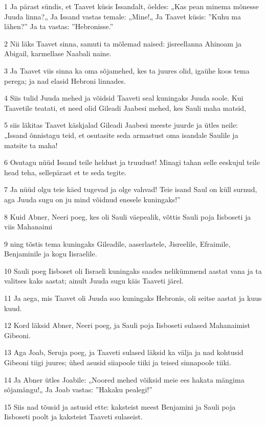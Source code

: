 \par 1 Ja pärast sündis, et Taavet küsis Issandalt, öeldes: „Kas pean minema mõnesse Juuda linna?„ Ja Issand vastas temale: „Mine!„ Ja Taavet küsis: ”Kuhu ma lähen?” Ja ta vastas: ”Hebronisse.”
\par 2 Nii läks Taavet sinna, samuti ta mõlemad naised: jisreellanna Ahinoam ja Abigail, karmellase Naabali naine.
\par 3 Ja Taavet viis sinna ka oma sõjamehed, kes ta juures olid, igaühe koos tema perega; ja nad elasid Hebroni linnades.
\par 4 Siis tulid Juuda mehed ja võidsid Taaveti seal kuningaks Juuda soole. Kui Taavetile teatati, et need olid Gileadi Jaabesi mehed, kes Sauli maha matsid,
\par 5 siis läkitas Taavet käskjalad Gileadi Jaabesi meeste juurde ja ütles neile: „Issand õnnistagu teid, et osutasite seda armastust oma isandale Saulile ja matsite ta maha!
\par 6 Osutagu nüüd Issand teile heldust ja truudust! Minagi tahan selle eeskujul teile head teha, sellepärast et te seda tegite.
\par 7 Ja nüüd olgu teie käed tugevad ja olge vahvad! Teie isand Saul on küll surnud, aga Juuda sugu on ju mind võidnud enesele kuningaks!”
\par 8 Kuid Abner, Neeri poeg, kes oli Sauli väepealik, võttis Sauli poja Iisboseti ja viis Mahanaimi
\par 9 ning tõstis tema kuningaks Gileadile, aaserlastele, Jisreelile, Efraimile, Benjaminile ja kogu Iisraelile.
\par 10 Sauli poeg Iisboset oli Iisraeli kuningaks saades nelikümmend aastat vana ja ta valitses kaks aastat; ainult Juuda sugu käis Taaveti järel.
\par 11 Ja aega, mis Taavet oli Juuda soo kuningaks Hebronis, oli seitse aastat ja kuus kuud.
\par 12 Kord läksid Abner, Neeri poeg, ja Sauli poja Iisboseti sulased Mahanaimist Gibeoni.
\par 13 Aga Joab, Seruja poeg, ja Taaveti sulased läksid ka välja ja nad kohtusid Gibeoni tiigi juures; ühed asusid siiapoole tiiki ja teised sinnapoole tiiki.
\par 14 Ja Abner ütles Joabile: „Noored mehed võiksid meie ees hakata mängima sõjamängu!„ Ja Joab vastas: ”Hakaku pealegi!”
\par 15 Siis nad tõusid ja astusid ette: kaksteist meest Benjamini ja Sauli poja Iisboseti poolt ja kaksteist Taaveti sulaseist.
